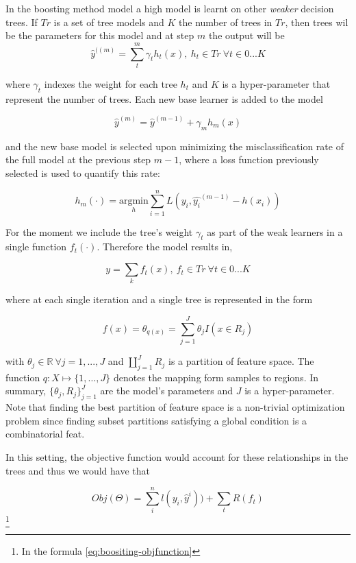 In the boosting method model a high model is learnt on other \textit{weaker} decision trees. If $Tr$ is a set of tree models and $K$ the number of trees in $Tr$, then trees wil be the parameters for this model and at step $m$ the output will be
\[
 \hat{y}^{((m)}=  \sum_t^m \gamma_t h_t(x) , \  h_t \in Tr \ \forall t \in {0...K}
\]

where $\gamma_t$ indexes the weight for each tree $h_t$ and $K$ is a hyper-parameter that represent the number of trees. Each new base learner is added to the model 


\[
 \hat{y}^{(m)} =   \hat{y}^{(m-1)}  + \gamma_m h_m(x) 
\]

and the new base model is selected upon minimizing the misclassification rate of the full model at the previous step $m-1$, where a loss function previously selected is used to quantify this rate:

\[
h_m(\cdot) = \underset{h}{\mathrm{argmin}}   \sum_{i=1}^{n} L ( y_i,  \hat{y_i}^{(m-1)} -  h(x_i)  ) 
\]






 
For the moment  we  include the tree's weight $\gamma_t$ as part of the weak learners in a single function $f_t(\cdot)$. Therefore the model results in,

\[
y =  \sum_k f_t(x) ,  \ f_t \in Tr  \ \forall t \in {0...K}
\]

where at each single iteration
and a single tree is represented in the form 

\[
f(x) = \theta_{q(x)} = \sum_{j=1}^J \theta_j I(x \in  R_j)
\]

with $\theta_j \in \mathbb{R} \ \forall j = 1,...,J$ and $ \coprod_{j=1}^J R_j$ is a partition of feature space. The function $q : X \mapsto \{1,...,J\}$ denotes the mapping form samples to regions. In summary, $\{\theta_j, R_j\}_{j=1}^J$ are the model's parameters and $J$ is a hyper-parameter. Note that finding the best partition of feature space is a non-trivial optimization problem since finding subset partitions satisfying a global condition is a combinatorial feat.

In this setting, the objective function would account for these relationships in the trees and thus we would have that

\[ Obj(\Theta) = \sum_i^n l(y_i,\hat{y}^i))  +  \sum_t R(f_t) \] \label{eq:boositing-objfunction} \footnote{In the formula \ref{eq:boositing-objfunction} }
%    

